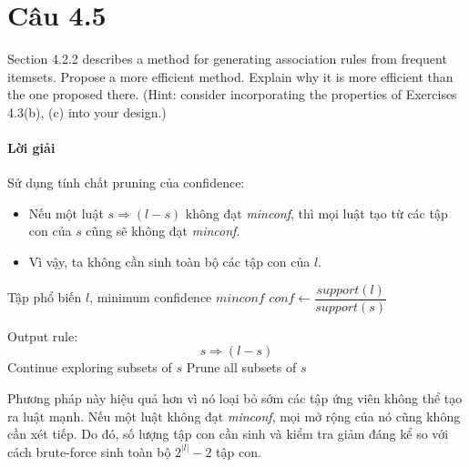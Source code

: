 \section{Câu 4.5}
Section 4.2.2 describes a method for generating association rules from frequent itemsets. Propose a more efficient method. Explain why it is more efficient than the one proposed there. (Hint: consider incorporating the properties of Exercises 4.3(b), (c) into your design.)

\paragraph{Lời giải}

Sử dụng tính chất pruning của confidence:

\begin{itemize}
    \item Nếu một luật $s \Rightarrow (l-s)$ không đạt \textit{minconf}, thì mọi luật tạo từ các tập con của $s$ cũng sẽ không đạt \textit{minconf}.
    \item Vì vậy, ta không cần sinh toàn bộ các tập con của $l$.
\end{itemize}

\begin{algorithm}[H]
    \caption{Cải tiến thuật toán sinh luật kết hợp}
    \begin{algorithmic}[1]
        \Require Tập phổ biến $l$, minimum confidence $minconf$
        \State $conf \gets \dfrac{support(l)}{support(s)}$

        \State Output rule:
        \[
            s \Rightarrow (l - s)
        \]
        \State Continue exploring subsets of $s$
        \Else
        \State Prune all subsets of $s$
        \EndIf
        \EndFor
    \end{algorithmic}
    \label{alg:strong_rules}
\end{algorithm}
Phương pháp này hiệu quả hơn vì nó loại bỏ sớm các tập ứng viên không thể tạo ra luật mạnh. Nếu một luật không đạt \textit{minconf}, mọi mở rộng của nó cũng không cần xét tiếp. Do đó, số lượng tập con cần sinh và kiểm tra giảm đáng kể so với cách brute-force sinh toàn bộ $2^{|l|}-2$ tập con.
